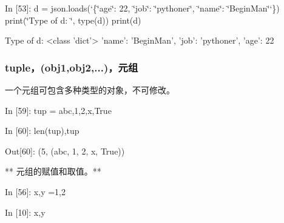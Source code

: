 \documentclass[letterpaper,10pt,english]{sphinxmanual}
\def\PYGZob{\char`\{}
\def\PYGZcb{\char`\}}
\def\PYGZsq{\char`\'}
\def\PYGZdq{\char`\"}
\renewcommand\PYGZsq{\textquotesingle}
\begin{document}
\begin{OriginalVerbatim}[commandchars=\\\{\}]
\textcolor{nbsphinxin}{In [53]: }d = json.loads(\PYGZsq{}\PYGZob{}\PYGZdq{}age\PYGZdq{}: 22, \PYGZdq{}job\PYGZdq{}: \PYGZdq{}pythoner\PYGZdq{}, \PYGZdq{}name\PYGZdq{}: \PYGZdq{}BeginMan\PYGZdq{}\PYGZcb{}\PYGZsq{})
         print(\PYGZdq{}Type of d: \PYGZdq{}, type(d))
         print(d)
\end{OriginalVerbatim}
\begin{OriginalVerbatim}[commandchars=\\\{\}]
Type of d:  <class 'dict'>
{'name': 'BeginMan', 'job': 'pythoner', 'age': 22}
\end{OriginalVerbatim}

\subsubsection{tuple，(obj1,obj2,...)，元组}
\label{pystart/pystart_databasic:tuple_uff0c(obj1,obj2,...)_uff0c_u5143_u7ec4}
一个元组可包含多种类型的对象，不可修改。

\begin{OriginalVerbatim}[commandchars=\\\{\}]
\textcolor{nbsphinxin}{In [59]: }tup = \PYGZsq{}abc\PYGZsq{},1,2,\PYGZsq{}x\PYGZsq{},True
\end{OriginalVerbatim}

\begin{OriginalVerbatim}[commandchars=\\\{\}]
\textcolor{nbsphinxin}{In [60]: }len(tup),tup
\end{OriginalVerbatim}

\begin{OriginalVerbatim}[commandchars=\\\{\}]
\textcolor{nbsphinxout}{Out[60]: }(5, (\PYGZsq{}abc\PYGZsq{}, 1, 2, \PYGZsq{}x\PYGZsq{}, True))
\end{OriginalVerbatim}

** 元组的赋值和取值。**

\begin{OriginalVerbatim}[commandchars=\\\{\}]
\textcolor{nbsphinxin}{In [56]: }x,y =1,2
\end{OriginalVerbatim}

\begin{OriginalVerbatim}[commandchars=\\\{\}]
\textcolor{nbsphinxin}{In [10]: }x,y
\end{OriginalVerbatim}
\end{document}
